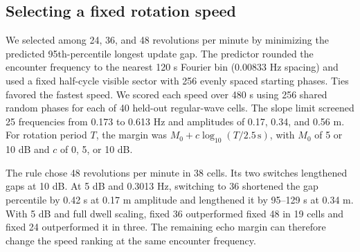 \subsection{Selecting a fixed rotation speed}

We selected among 24, 36, and 48 revolutions per minute by minimizing the predicted 95th-percentile longest update gap. The predictor rounded the encounter frequency to the nearest 120 s Fourier bin (0.00833 Hz spacing) and used a fixed half-cycle visible sector with 256 evenly spaced starting phases. Ties favored the fastest speed. We scored each speed over 480 s using 256 shared random phases for each of 40 held-out regular-wave cells. The slope limit screened 25 frequencies from 0.173 to 0.613 Hz and amplitudes of 0.17, 0.34, and 0.56 m. For rotation period $T$, the margin was $M_0+c\log_{10}(T/2.5\,\mathrm{s})$, with $M_0$ of 5 or 10 dB and $c$ of 0, 5, or 10 dB.

The rule chose 48 revolutions per minute in 38 cells. Its two switches lengthened gaps at 10 dB. At 5 dB and 0.3013 Hz, switching to 36 shortened the gap percentile by 0.42 s at 0.17 m amplitude and lengthened it by 95--129 s at 0.34 m. With 5 dB and full dwell scaling, fixed 36 outperformed fixed 48 in 19 cells and fixed 24 outperformed it in three. The remaining echo margin can therefore change the speed ranking at the same encounter frequency.
